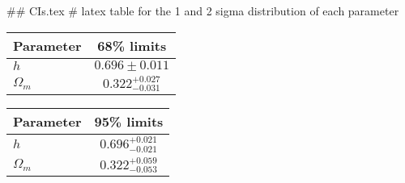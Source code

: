 ## CIs.tex
# latex table for the 1 and 2 sigma distribution of each parameter

\begin{tabular} { l  c}
 Parameter &  68\% limits\\
\hline
{\boldmath$h              $} & $0.696\pm 0.011            $\\
{\boldmath$\Omega_m       $} & $0.322^{+0.027}_{-0.031}   $\\
\hline
\end{tabular}

\begin{tabular} { l  c}
 Parameter &  95\% limits\\
\hline
{\boldmath$h              $} & $0.696^{+0.021}_{-0.021}   $\\
{\boldmath$\Omega_m       $} & $0.322^{+0.059}_{-0.053}   $\\
\hline
\end{tabular}

